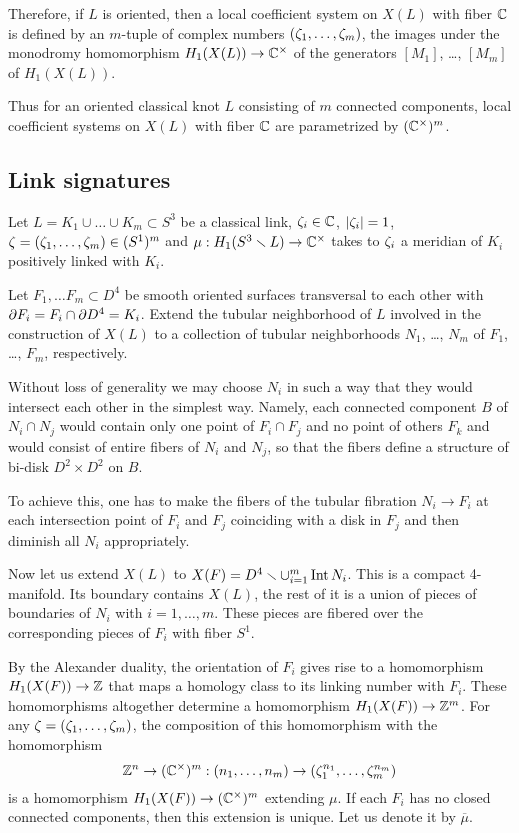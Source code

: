 \documentclass{article}
\numberwithin{equation}{section}
\begin{document}
Therefore, if $L$ is oriented, then 
a local coefficient system on $X(L)$ with fiber $\mathbb C$ is defined 
by an $m$-tuple of complex numbers $(\zeta_1,\dots,\zeta_m)$, the images 
under the monodromy homomorphism
$H_1(X(L))\to\mathbb C^\times$ of the generators $[M_1]$, \dots, $[M_m]$ of 
$H_1(X(L))$. 


Thus for an oriented classical knot $L$ consisting of $m$ connected
components, local coefficient systems 
on $X(L)$ with fiber $\mathbb C$ are parametrized by $(\mathbb C^\times)^m$.

\subsection{Link signatures}\label{s2.3} 
Let $L=K_1\cup\dots\cup K_m\subset S^3$ be a classical
link, $\zeta_i\in\mathbb C$, $|\zeta_i|=1$,
$\zeta=(\zeta_1,\dots,\zeta_m)\in (S^1)^m$ and $\mu:H_1(S^3\smallsetminus
L)\to\mathbb C^\times$ takes to $\zeta_i$ a meridian of $K_i$ positively 
linked with $K_i$.

Let $F_1,\dots F_m\subset D^4$ be smooth oriented surfaces transversal 
to each other with $\partial F_i=F_i\cap\partial D^4=K_i$. Extend the tubular 
neighborhood of $L$ involved in the construction of $X(L)$ to a 
collection of tubular neighborhoods $N_1$, \dots, $N_m$ of 
$F_1$, \dots, $F_m$, respectively. 

Without loss of generality we may choose $N_i$ in such a way that they 
would intersect each other in the simplest way. 
Namely, each connected 
component $B$ of $N_i\cap N_j$ would contain only one point of 
$F_i\cap F_j$ and no point of others $F_k$ 
and would consist of entire fibers of $N_i$ and $N_j$, 
so that the fibers define a structure of bi-disk $D^2\times D^2$ on $B$.

To achieve this, one has to make the fibers of the tubular fibration 
$N_i\to F_i$ at each intersection point of $F_i$ and $F_j$ coinciding 
with a disk in $F_j$ and then diminish all $N_i$ appropriately. 

Now let us extend $X(L)$ to $X(F)=D^4\smallsetminus\cup_{i=1}^m\operatorname{Int} N_i$.
This is a compact 4-manifold. Its boundary contains $X(L)$, the rest of
it is a union of pieces of boundaries of $N_i$ with $i=1,\dots, m$. 
These pieces are fibered over the corresponding pieces of $F_i$ with
fiber $S^1$.

By the Alexander duality, the orientation of $F_i$ gives rise to a 
homomorphism $H_1(X(F))\to\mathbb Z$ that maps a homology class to its 
linking number with $F_i$.
These homomorphisms altogether determine a homomorphism 
$H_1(X(F))\to \mathbb Z^m$. For any $\zeta=(\zeta_1,\dots,\zeta_m)$, the composition
of this homomorphism with the homomorphism 
$$\mathbb Z^n\to(\mathbb C^\times)^m:
(n_1,\dots,n_m)\to(\zeta_1^{n_1},\dots,\zeta_m^{n_m})$$     
is a homomorphism $H_1(X(F))\to(\mathbb C^\times)^m$ extending $\mu$.
 If each $F_i$ has no closed connected components, then this extension 
is unique. 
Let us denote it by $\overline\mu$. 
\end{document}
